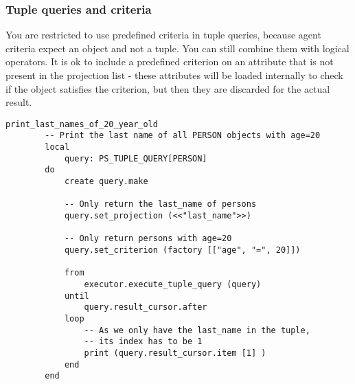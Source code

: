 \subsubsection{Tuple queries and criteria}
You are restricted to use predefined criteria in tuple queries, because agent criteria expect an object and not a tuple. 
You can still combine them with logical operators.
It is ok to include a predefined criterion on an attribute that is not present in the projection list - these attributes will be loaded internally to check if the object satisfies the criterion, but then they are discarded for the actual result.

\begin{lstlisting}[language=OOSC2Eiffel, captionpos=b, caption={}, label={lst:tuple_projection_selection}]
	print_last_names_of_20_year_old
		-- Print the last name of all PERSON objects with age=20
		local
			query: PS_TUPLE_QUERY[PERSON]
		do
			create query.make

			-- Only return the last_name of persons
			query.set_projection (<<"last_name">>)

			-- Only return persons with age=20
			query.set_criterion (factory [["age", "=", 20]])

			from
				executor.execute_tuple_query (query)
			until
				query.result_cursor.after
			loop
				-- As we only have the last_name in the tuple,
				-- its index has to be 1
				print (query.result_cursor.item [1] )
			end			
		end
\end{lstlisting}
